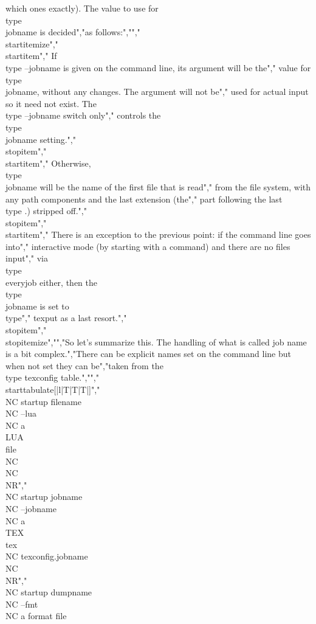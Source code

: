 which ones exactly). The value to use for \\type {\\jobname} is decided","as follows:","","\\startitemize","\\startitem","    If \\type {--jobname} is given on the command line, its argument will be the","    value for \\type {\\jobname}, without any changes. The argument will not be","    used for actual input so it need not exist. The \\type {--jobname} switch only","    controls the \\type {\\jobname} setting.","\\stopitem","\\startitem","    Otherwise, \\type {\\jobname} will be the name of the first file that is read","    from the file system, with any path components and the last extension (the","    part following the last \\type {.}) stripped off.","\\stopitem","\\startitem","    There is an exception to the previous point: if the command line goes into","    interactive mode (by starting with a command) and there are no files input","    via \\type {\\everyjob} either, then the \\type {\\jobname} is set to \\type","    {texput} as a last resort.","\\stopitem","\\stopitemize","","So let's summarize this. The handling of what is called job name is a bit complex.","There can be explicit names set on the command line but when not set they can be","taken from the \\type {texconfig} table.","","\\starttabulate[|l|T|T|T|]","\\NC startup filename \\NC --lua     \\NC a \\LUA\\ file  \\NC                      \\NC \\NR","\\NC startup jobname  \\NC --jobname \\NC a \\TEX\\ tex   \\NC texconfig.jobname    \\NC \\NR","\\NC startup dumpname \\NC --fmt     \\NC a format file 